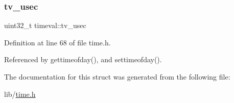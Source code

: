 \mbox{\label{structtimeval_a8fd7abf5420981b3ff58bb23df458587}} 
\subsubsection{\texorpdfstring{tv\+\_\+usec}{tv\_usec}}
{\footnotesize\ttfamily uint32\+\_\+t timeval\+::tv\+\_\+usec}



Definition at line 68 of file time.\+h.



Referenced by gettimeofday(), and settimeofday().



The documentation for this struct was generated from the following file\+:\begin{DoxyCompactItemize}
\item 
lib/\hyperlink{time_8h}{time.\+h}\end{DoxyCompactItemize}
